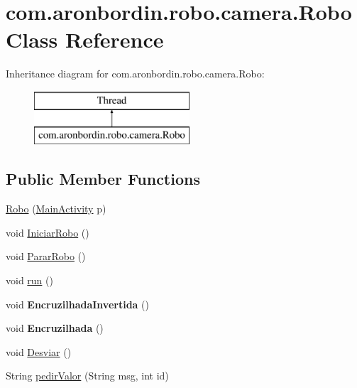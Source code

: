 \hypertarget{classcom_1_1aronbordin_1_1robo_1_1camera_1_1Robo}{\section{com.\+aronbordin.\+robo.\+camera.\+Robo Class Reference}
\label{classcom_1_1aronbordin_1_1robo_1_1camera_1_1Robo}
}
Inheritance diagram for com.\+aronbordin.\+robo.\+camera.\+Robo\+:\begin{figure}[H]
\begin{center}
\leavevmode
\includegraphics[height=2.000000cm]{df/d6a/classcom_1_1aronbordin_1_1robo_1_1camera_1_1Robo}
\end{center}
\end{figure}
\subsection*{Public Member Functions}
\begin{DoxyCompactItemize}
\item 
\hyperlink{classcom_1_1aronbordin_1_1robo_1_1camera_1_1Robo_a0480d3ff0c17c3acca728036f752c563}{Robo} (\hyperlink{classcom_1_1aronbordin_1_1robo_1_1camera_1_1MainActivity}{Main\+Activity} p)
\item 
void \hyperlink{classcom_1_1aronbordin_1_1robo_1_1camera_1_1Robo_a84b416945e3162ab1b1bb1dea5220339}{Iniciar\+Robo} ()
\item 
void \hyperlink{classcom_1_1aronbordin_1_1robo_1_1camera_1_1Robo_a7fbc061611f1fc6cdd362bedff8d2db4}{Parar\+Robo} ()
\item 
void \hyperlink{classcom_1_1aronbordin_1_1robo_1_1camera_1_1Robo_a04cd1e45ad45e03c773cc4e5ef7dbff7}{run} ()
\item 
\hypertarget{classcom_1_1aronbordin_1_1robo_1_1camera_1_1Robo_a880568348f2029e7451d6c9a087ce473}{void {\bfseries Encruzilhada\+Invertida} ()}\label{classcom_1_1aronbordin_1_1robo_1_1camera_1_1Robo_a880568348f2029e7451d6c9a087ce473}

\item 
\hypertarget{classcom_1_1aronbordin_1_1robo_1_1camera_1_1Robo_a1eeb38dd522233031de91b821e806264}{void {\bfseries Encruzilhada} ()}\label{classcom_1_1aronbordin_1_1robo_1_1camera_1_1Robo_a1eeb38dd522233031de91b821e806264}

\item 
void \hyperlink{classcom_1_1aronbordin_1_1robo_1_1camera_1_1Robo_af4c9ecee2838f22efd53f84b48e14c55}{Desviar} ()
\item 
String \hyperlink{classcom_1_1aronbordin_1_1robo_1_1camera_1_1Robo_af307e730541de825a3017353b06a8667}{pedir\+Valor} (String msg, int id)
\end{DoxyCompactItemize}
